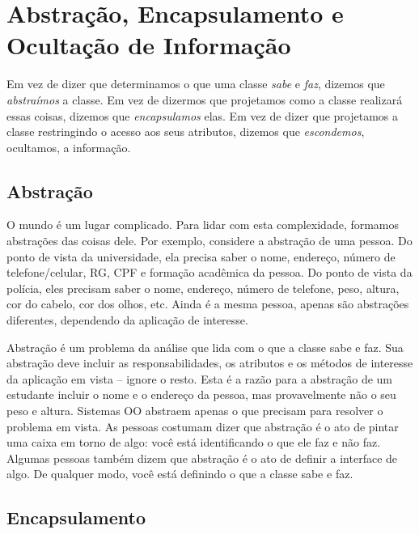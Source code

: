 \section{Abstração, Encapsulamento e Ocultação de Informação}

Em vez de dizer que determinamos o que uma classe \textit{sabe} e \textit{faz}, dizemos que \emph{abstraímos} a classe. Em vez de dizermos que projetamos como a classe realizará essas coisas, dizemos que \emph{encapsulamos} elas. Em vez de dizer que projetamos a classe restringindo o acesso aos seus atributos, dizemos que \emph{escondemos}, ocultamos, a informação.

\subsection{Abstração}

O mundo é um lugar complicado. Para lidar com esta complexidade, formamos abstrações das coisas dele. Por exemplo, considere a abstração de uma pessoa. Do ponto de vista da universidade, ela precisa saber o nome, endereço, número de telefone/celular, RG, CPF e formação acadêmica da pessoa. Do ponto de vista da polícia, eles precisam saber o nome, endereço, número de telefone, peso, altura, cor do cabelo, cor dos olhos, etc. Ainda é a mesma pessoa, apenas são abstrações diferentes, dependendo da aplicação de interesse.

Abstração é um problema da análise que lida com o que a classe sabe e faz. Sua abstração deve incluir as responsabilidades, os atributos e os métodos de interesse da aplicação em vista -- ignore o resto. Esta é a razão para a abstração de um estudante incluir o nome e o endereço da pessoa, mas provavelmente não o seu peso e altura. Sistemas OO abstraem apenas o que precisam para resolver o problema em vista. As pessoas costumam dizer que abstração é o ato de pintar uma caixa em torno de algo: você está identificando o que ele faz e não faz. Algumas pessoas também dizem que abstração é o ato de definir a interface de algo. De qualquer modo, você está definindo o que a classe sabe e faz.

\subsection{Encapsulamento}

